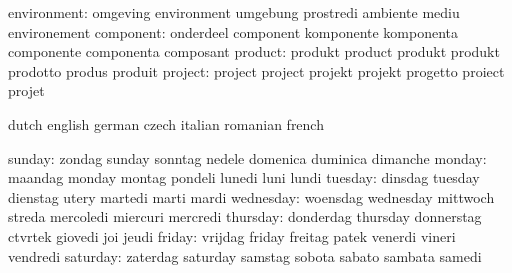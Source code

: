               environment: omgeving                  environment
                           umgebung                  prostredi
                           ambiente                  mediu
                           environement
                component: onderdeel                 component
                           komponente                komponenta
                           componente                componenta
                           composant
                  product: produkt                   product
                           produkt                   produkt
                           prodotto                  produs
                           produit
                  project: project                   project
                           projekt                   projekt
                           progetto                  proiect
                           projet

\stopvariables




\startvariables            dutch                     english
                           german                    czech
                           italian                   romanian
                           french

                   sunday: zondag                    sunday
                           sonntag                   nedele
                           domenica                  duminica
                           dimanche
                   monday: maandag                   monday
                           montag                    pondeli
                           lunedi                    luni
                           lundi
                  tuesday: dinsdag                   tuesday
                           dienstag                  utery
                           martedi                   marti
                           mardi
                wednesday: woensdag                  wednesday
                           mittwoch                  streda
                           mercoledi                 miercuri
                           mercredi
                 thursday: donderdag                 thursday
                           donnerstag                ctvrtek
                           giovedi                   joi
                           jeudi
                   friday: vrijdag                   friday
                           freitag                   patek
                           venerdi                   vineri
                           vendredi
                 saturday: zaterdag                  saturday
                           samstag                   sobota
                           sabato                    sambata
                           samedi
\stopvariables

